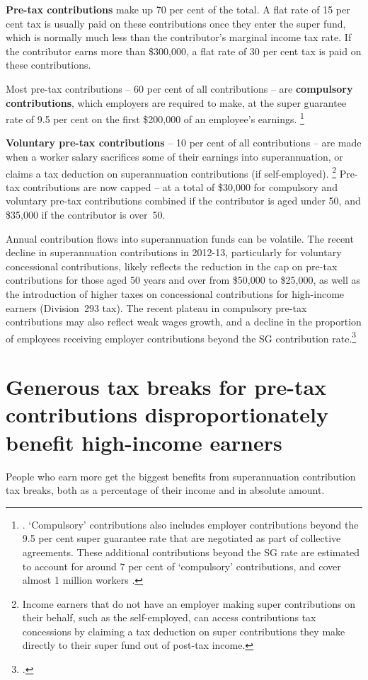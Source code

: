 \documentclass{grattanAlpha}
\begin{document}
\textbf{Pre-tax contributions} make up 70 per cent of the total. A flat rate of 15 per cent tax is usually paid on these contributions once they enter the super fund, which is normally much less than the contributor’s marginal income tax rate. If the contributor earns more than \$300,000, a flat rate of 30 per cent tax is paid on these contributions.

Most pre-tax contributions – 60 per cent of all contributions – are \textbf{compulsory contributions}, which employers are required to make, at the super guarantee rate of 9.5 per cent on the first \$200,000 of an employee’s earnings.%
\footnote{\textcites{APRA2014}{ATO2015SampleFile1213}{ATO2015MaxSuperContrBase}. `Compulsory' contributions also includes employer contributions beyond the 9.5 per cent super guarantee rate that are negotiated as part of collective agreements. These additional contributions beyond the SG rate are estimated to account for around 7 per cent of ‘compulsory’ contributions, and cover almost 1 million workers \textcite[][16]{Kelly2013}.}  

\textbf{Voluntary pre-tax contributions} – 10 per cent of all contributions – are made when a worker salary sacrifices some of their earnings into superannuation, or claims a tax deduction on superannuation contributions (if self-employed).%
\footnote{Income earners that do not have an employer making super contributions on their behalf, such as the self-employed, can access contributions tax concessions by claiming a tax deduction on super contributions they make directly to their super fund out of post-tax income.}
Pre-tax contributions are now capped – at a total of \$30,000 for compulsory and voluntary pre-tax contributions combined if the contributor is aged under 50, and \$35,000 if the contributor is over~50.

Annual contribution flows into superannuation funds can be volatile. The recent decline in superannuation contributions in 2012-13, particularly for voluntary concessional contributions, likely reflects the reduction in the cap on pre-tax contributions for those aged 50 years and over from \$50,000 to \$25,000, as well as the introduction of higher taxes on concessional contributions for high-income earners (Division~293 tax). The recent plateau in compulsory pre-tax contributions may also reflect weak wages growth, and a decline in the proportion of employees receiving employer contributions beyond the SG contribution rate.\footcite[][15--16]{Kelly2013}

\section{Generous tax breaks for pre-tax contributions disproportionately benefit high-income earners}
People who earn more get the biggest benefits from superannuation contribution tax breaks, both as a percentage of their income and in absolute amount. 
\end{document}
